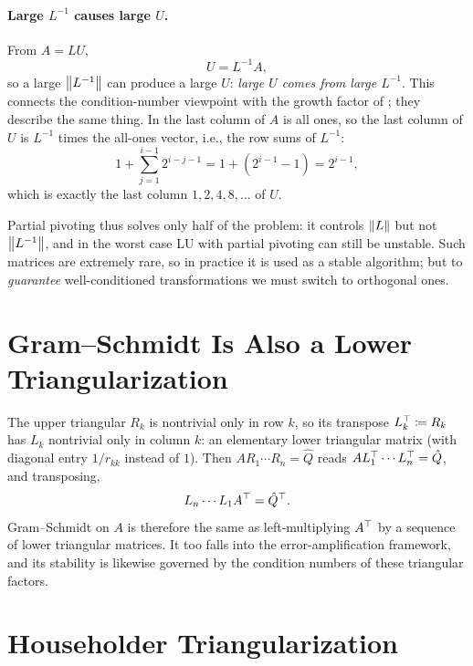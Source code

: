 \paragraph{Large $L^{-1}$ causes large $U$.} From $A = LU$,
\begin{equation}
  U = L^{-1}A,
\end{equation}
so a large $\left\lVert L^{-1} \right\rVert$ can produce a large $U$: \emph{large $U$ comes from large $L^{-1}$}. This connects the condition-number viewpoint with the growth factor of ; they describe the same thing. In  the last column of $A$ is all ones, so the last column of $U$ is $L^{-1}$ times the all-ones vector, i.e., the row sums of $L^{-1}$:
\begin{equation}
  1 + \sum_{j=1}^{i-1}2^{i-j-1} = 1 + (2^{i-1} - 1) = 2^{i-1},
\end{equation}
which is exactly the last column $1, 2, 4, 8, \dots$ of $U$.

Partial pivoting thus solves only half of the problem: it controls $\left\lVert L \right\rVert$ but not $\left\lVert L^{-1} \right\rVert$, and in the worst case LU with partial pivoting can still be unstable. Such matrices are extremely rare, so in practice it is used as a stable algorithm; but to \emph{guarantee} well-conditioned transformations we must switch to orthogonal ones.

\section{Gram--Schmidt Is Also a Lower Triangularization}

The upper triangular $R_k$ is nontrivial only in row $k$, so its transpose $L_k^\top \coloneqq R_k$ has $L_k$ nontrivial only in column $k$: an elementary lower triangular matrix (with diagonal entry $1/r_{kk}$ instead of $1$). Then $AR_1 \cdots R_n = \hat{Q}$ reads $AL_1^\top \cdots L_n^\top = \hat{Q}$, and transposing,
\begin{equation}
  L_n \cdots L_1A^\top = \hat{Q}^\top.
\end{equation}
Gram--Schmidt on $A$ is therefore the same as left-multiplying $A^\top$ by a sequence of lower triangular matrices. It too falls into the error-amplification framework, and its stability is likewise governed by the condition numbers of these triangular factors.

\section{Householder Triangularization}

